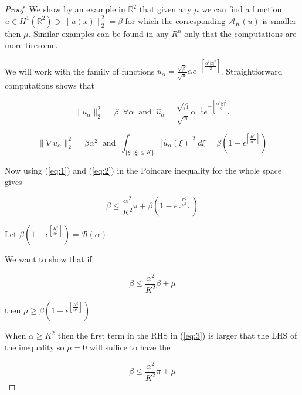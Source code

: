 \documentclass{amsart}
\numberwithin{Theorem}{section}
\numberwithin{equation}{section}
\theoremstyle{definition}
\theoremstyle{remark}
\begin{document}
\begin{proof}

We show by an example in ${{\mathbb R}}^2$ that given any $\mu$  we can find a function $u\in H^1({{\mathbb R}}^2) \ni \|u(x)\|_2^2 =\beta $ for which the corresponding $ {{\mathcal A}}_{K}(u)$ is smaller then $\mu$. Similar examples can be found in any $R^n$ only that the computations are more tiresome.

We will work with the family of functions $u_{\alpha} =\frac{\sqrt{\beta}}{\sqrt{\pi}} \alpha e^{-[\frac{\alpha^2 |x|^2}{2}]}$.  Straightforward computations shows that

\begin{equation} \label{eq:1}
\|u_{\alpha} \|_2^2   = \beta \;\;\forall \alpha \;\;\mbox{and}\;\;\widehat{u}_{\alpha} =\frac{\sqrt{\beta}}{\sqrt{\pi}} \alpha^{-1}e^{-[\frac{\alpha^2 |\xi|^2}{2}]}
\end{equation}

\begin{equation} \label{eq:2}
\|\nabla u_{\alpha} \|_2^2 = \beta \alpha^2  \;\;\mbox{and}\;\; \int_{\{\xi:|\xi|\leq K\}} | \widehat{u}_{\alpha}(\xi)|^2\;d\xi
= \beta(1-{\epsilon}^{[\frac{K^2}{\alpha^2}]})
 \end{equation}

Now using (\ref{eq:1}) and (\ref{eq:2}) in the Poincare inequality for the whole space gives

\begin{equation} \label{eq:3}
\beta \leq \frac{\alpha^2}{K^2} \pi + \beta(1-{\epsilon}^{[\frac{K^2}{\alpha^2}]})
\end{equation}

Let $ \beta (1-{\epsilon}^{[\frac{K^2}{\alpha^2}]}) ={{\mathcal B}}(\alpha)$

We want to show that if

\begin{equation} \label{eq:4}
\beta \leq \frac{\alpha^2}{K^2} \beta + \mu
\end{equation}

then $\mu \geq   \beta (1-{\epsilon}^{[\frac{K^2}{\alpha^2}]})$

When $\alpha \geq K^2$  then the first term in the RHS in (\ref{eq:3}) is larger that the LHS of the inequality so $\mu=0$ will suffice to have the

\begin{equation} \label{eq:5}
\beta \leq \frac{\alpha^2}{K^2} \pi + \mu
\end{equation}


\end{proof}
\end{document}
